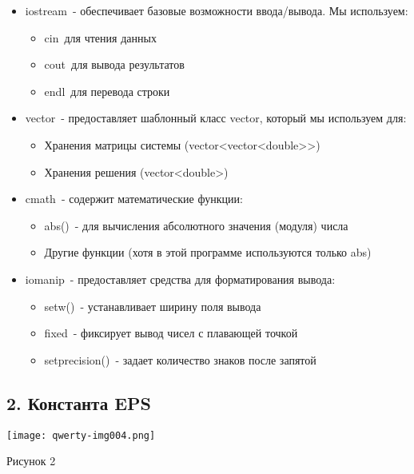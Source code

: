 \documentclass{article}
\begin{document}
\begin{itemize}
\item iostream - обеспечивает базовые возможности ввода/вывода. Мы используем:

\begin{itemize}
\item cin для чтения данных
\item cout для вывода результатов
\item endl для перевода строки
\end{itemize}
\item vector - предоставляет шаблонный класс vector, который мы используем для:

\begin{itemize}
\item Хранения матрицы системы (vector{\textless}vector{\textless}double{\textgreater}{\textgreater})
\item Хранения решения (vector{\textless}double{\textgreater})
\end{itemize}
\item cmath - содержит математические функции:

\begin{itemize}
\item abs() - для вычисления абсолютного значения (модуля) числа
\item Другие функции (хотя в этой программе используются только abs)
\end{itemize}
\item iomanip - предоставляет средства для форматирования вывода:

\begin{itemize}
\item setw() - устанавливает ширину поля вывода
\item fixed - фиксирует вывод чисел с плавающей точкой
\item setprecision() - задает количество знаков после запятой
\end{itemize}
\end{itemize}

\bigskip

\clearpage\subsection{2. Константа EPS}
 \texttt{[image: qwerty-img004.png]} 

Рисунок 2


\bigskip
\end{document}
